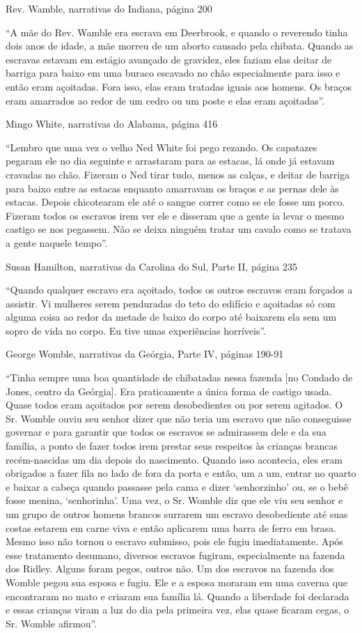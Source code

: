 Rev. Wamble, narrativas do Indiana, página 200

``A mãe do Rev. Wamble era escrava em Deerbrook, e quando o reverendo
tinha dois anos de idade, a mãe morreu de um aborto causado pela
chibata. Quando as escravas estavam em estágio avançado de gravidez,
eles faziam elas deitar de barriga para baixo em uma buraco escavado no
chão especialmente para isso e então eram açoitadas. Fora isso, elas
eram tratadas iguais aos homens. Os braços eram amarrados ao redor de um
cedro ou um poste e elas eram açoitadas''.

Mingo White, narrativas do Alabama, página 416

``Lembro que uma vez o velho Ned White foi pego rezando. Os capatazes
pegaram ele no dia seguinte e arrastaram para as estacas, lá onde já
estavam cravadas no chão. Fizeram o Ned tirar tudo, menos as calças, e
deitar de barriga para baixo entre as estacas enquanto amarravam os
braços e as pernas dele às estacas. Depois chicotearam ele até o sangue
correr como se ele fosse um porco. Fizeram todos os escravos irem ver
ele e disseram que a gente ia levar o mesmo castigo se nos pegassem. Não
se deixa ninguém tratar um cavalo como se tratava a gente naquele
tempo''.

Susan Hamilton, narrativas da Carolina do Sul, Parte II, página 235

``Quando qualquer escravo era açoitado, todos os outros escravos eram
forçados a assistir. Vi mulheres serem penduradas do teto do edifício e
açoitadas só com alguma coisa ao redor da metade de baixo do corpo até
baixarem ela sem um sopro de vida no corpo. Eu tive umas experiências
horríveis''.

George Womble, narrativas da Geórgia, Parte IV, páginas 190-91

``Tinha sempre uma boa quantidade de chibatadas nessa fazenda {[}no
Condado de Jones, centro da Geórgia{]}. Era praticamente a única forma
de castigo usada. Quase todos eram açoitados por serem desobedientes ou
por serem agitados. O Sr. Womble ouviu seu senhor dizer que não teria um
escravo que não conseguisse governar e para garantir que todos os
escravos se admirassem dele e da sua família, a ponto de fazer todos
irem prestar seus respeitos às crianças brancas recém-nascidas um dia
depois do nascimento. Quando isso acontecia, eles eram obrigados a fazer
fila no lado de fora da porta e então, um a um, entrar no quarto e
baixar a cabeça quando passasse pela cama e dizer `senhorzinho' ou, se o
bebê fosse menina, `senhorinha'. Uma vez, o Sr. Womble diz que ele viu
seu senhor e um grupo de outros homens brancos surrarem um escravo
desobediente até suas costas estarem em carne viva e então aplicarem uma
barra de ferro em brasa. Mesmo isso não tornou o escravo submisso, pois
ele fugiu imediatamente. Após esse tratamento desumano, diversos
escravos fugiram, especialmente na fazenda dos Ridley. Alguns foram
pegos, outros não. Um dos escravos na fazenda dos Womble pegou sua
esposa e fugiu. Ele e a esposa moraram em uma caverna que encontraram no
mato e criaram sua família lá. Quando a liberdade foi declarada e essas
crianças viram a luz do dia pela primeira vez, elas quase ficaram cegas,
o Sr. Womble afirmou''.

